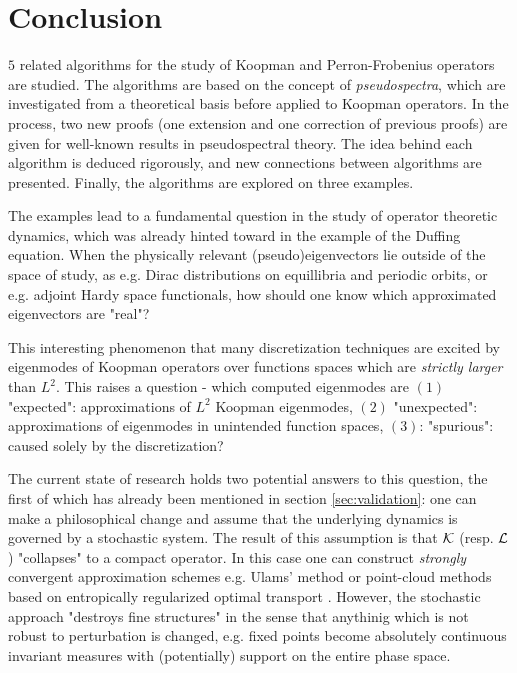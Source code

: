 
\section{Conclusion}

$5$ related algorithms for the study of Koopman and Perron-Frobenius operators are studied. 
The algorithms are based on the concept of \emph{pseudospectra}, which are investigated 
from a theoretical basis before applied to Koopman operators. In the process, two new 
proofs (one extension and one correction of previous proofs) are given for well-known 
results in pseudospectral theory. The idea behind each algorithm is deduced rigorously, 
and new connections between algorithms are presented. Finally, the algorithms are explored 
on three examples. 

The examples lead to a fundamental question in the study of operator theoretic dynamics, 
which was already hinted toward in the example of the Duffing equation. When the 
physically relevant (pseudo)eigenvectors lie outside of the space of study, as e.g. Dirac 
distributions on equillibria and periodic orbits, or e.g. adjoint Hardy space functionals, 
how should one know which approximated eigenvectors are "real"? 

This interesting phenomenon that many discretization techniques are excited by eigenmodes of 
Koopman operators over functions spaces which are \emph{strictly larger} than $L^2$. 
This raises a question - which computed eigenmodes are $(1)$ "expected": 
approximations of $L^2$ Koopman eigenmodes, $(2)$ "unexpected": approximations of 
eigenmodes in unintended function spaces, $(3)$: "spurious": caused solely by the 
discretization?

The current state of research holds two potential answers to this question, the first of 
which has already been mentioned in section \ref{sec:validation}: one can make a 
philosophical change and assume that the underlying dynamics is governed by a 
stochastic system. The result of this assumption is that $\mathcal{K}$ (resp. $\mathcal{L}$) 
"collapses" to a compact operator. In this case one can construct \emph{strongly} 
convergent approximation schemes e.g. Ulams' method \cite{attr} or point-cloud methods 
based on entropically regularized optimal transport \cite{entropic}. However, the 
stochastic approach "destroys fine structures" in the sense that anythinig which is 
not robust to perturbation is changed, e.g. fixed points become absolutely continuous 
invariant measures with (potentially) support on the entire phase space. 


